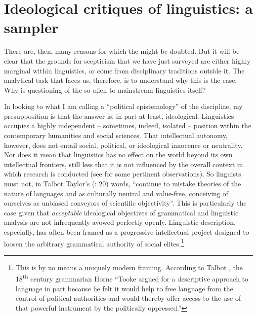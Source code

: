 \documentclass[output=paper]{langscibook}
\begin{document}
\section{Ideological critiques of linguistics: a sampler}
\label{sec:riemer:ideologicalcritiques}

There are, then, many reasons for which the  might be doubted. But it will be clear that the grounds for scepticism that we have just surveyed are either highly marginal within linguistics, or come from disciplinary traditions outside it. The analytical task that faces us, therefore, is to understand why this is the case. Why is questioning of the  so alien to mainstream linguistics itself?

In looking to what I am calling a ``political epistemology'' of the discipline, my presupposition is that the answer is, in part at least, ideological. Linguistics occupies a highly independent -- sometimes, indeed, isolated -- position within the contemporary humanities and social sciences. That intellectual autonomy, however, does not entail social, political, or ideological innocence or neutrality. Nor does it mean that linguistics has no effect on the world beyond its own intellectual frontiers, still less that it is not influenced by the overall context in which research is conducted (see \citealt[182]{Joseph2002whitney} for some pertinent observations). So linguists must not, in Talbot Taylor's (\citeyear{Taylor1990}: 20) words, ``continue to mistake theories of the nature of languages and  as culturally neutral and value-free, conceiving of ourselves as unbiased conveyors of scientific objectivity''. This is particularly the case given that \emph{acceptable} ideological objectives of grammatical and linguistic analysis are not infrequently avowed perfectly openly. Linguistic description, especially, has often been framed as a progressive intellectual project designed to loosen the arbitrary grammatical authority of social elites.\footnote{This is by no means a uniquely modern framing. According to Talbot \citet[11]{Taylor1990}, the 18\textsuperscript{th} century grammarian Horne ``Tooke argued for a descriptive approach to language in part because he felt it would help to free language from the control of political authorities and would thereby offer access to the use of that powerful instrument by the politically oppressed.''}
\end{document}

